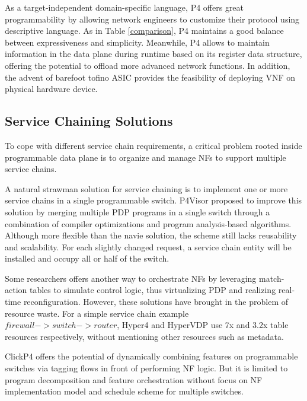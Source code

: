 \documentclass[10pt, conference, letterpaper]{IEEEtran}
\begin{document}
As a target-independent domain-specific language, P4 offers great programmability by allowing network engineers to customize their protocol using descriptive language. As in Table \ref{comparison}, P4 maintains a good balance between expressiveness and simplicity. 
Meanwhile, P4 allows to maintain information in the data plane during runtime based on its register data structure, offering the potential to offload more advanced network functions. 
In addition, the advent of barefoot tofino ASIC provides the feasibility of deploying VNF on physical hardware device.

\subsection{Service Chaining Solutions}
To cope with different service chain requirements, a critical problem rooted inside programmable data plane is to organize and manage NFs to support multiple service chains. 

A natural strawman solution for service chaining is to implement one or more service chains in a single programmable switch. P4Visor proposed to improve this solution by merging multiple PDP programs in a single switch through a combination of compiler optimizations and program analysis-based algorithms. 
Although more flexible than the navie solution, the scheme still lacks reusability and scalability. For each slightly changed request, a service chain entity will be installed and occupy all or half of the switch.

Some researchers \cite{hancock2016hyper4} \cite{zhang2019hypervdp} offers another way to orchestrate NFs by leveraging match-action tables to simulate control logic, thus virtualizing PDP and realizing real-time reconfiguration. However, these solutions have brought in the problem of resource waste. For a simple service chain example $firewall->switch->router$, Hyper4\cite{hancock2016hyper4} and HyperVDP\cite{zhang2019hypervdp} use 7x and 3.2x table resources respectively, without mentioning other resources such as metadata.

ClickP4 offers the potential of dynamically combining features on programmable switches via tagging flows in front of performing NF logic. But it is limited to program decomposition and feature orchestration without focus on NF implementation model and schedule scheme for multiple switches.
\end{document}
